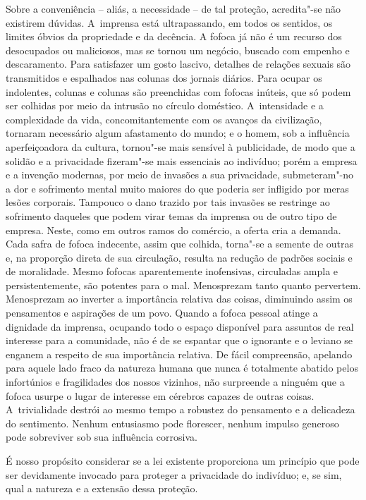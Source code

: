 Sobre a conveniência -- aliás, a necessidade -- de tal proteção,
acredita"-se não existirem dúvidas. A~imprensa está ultrapassando, em
todos os sentidos, os limites óbvios da propriedade e da decência. A
fofoca já não é um recurso dos desocupados ou maliciosos, mas se tornou
um negócio, buscado com empenho e descaramento. Para satisfazer um gosto
lascivo, detalhes de relações sexuais são transmitidos e espalhados nas
colunas dos jornais diários. Para ocupar os indolentes, colunas e
colunas são preenchidas com fofocas inúteis, que só podem ser colhidas
por meio da intrusão no círculo doméstico. A~intensidade e a
complexidade da vida, concomitantemente com os avanços da civilização,
tornaram necessário algum afastamento do mundo; e o homem, sob a
influência aperfeiçoadora da cultura, tornou"-se mais sensível à
publicidade, de modo que a solidão e a privacidade fizeram"-se mais
essenciais ao indivíduo; porém a empresa e a invenção modernas, por meio
de invasões a sua privacidade, submeteram"-no a dor e sofrimento mental
muito maiores do que poderia ser infligido por meras lesões corporais.
Tampouco o dano trazido por tais invasões se restringe ao sofrimento
daqueles que podem virar temas da imprensa ou de outro tipo de empresa.
Neste, como em outros ramos do comércio, a oferta cria a demanda. Cada
safra de fofoca indecente, assim que colhida, torna"-se a semente de
outras e, na proporção direta de sua circulação, resulta na redução de
padrões sociais e de moralidade. Mesmo fofocas aparentemente
inofensivas, circuladas ampla e persistentemente, são potentes para o
mal. Menosprezam tanto quanto pervertem. Menosprezam ao inverter a
importância relativa das coisas, diminuindo assim os pensamentos e
aspirações de um povo. Quando a fofoca pessoal atinge a dignidade da
imprensa, ocupando todo o espaço disponível para assuntos de real
interesse para a comunidade, não é de se espantar que o ignorante e o
leviano se enganem a respeito de sua importância relativa. De fácil
compreensão, apelando para aquele lado fraco da natureza humana que
nunca é totalmente abatido pelos infortúnios e fragilidades dos nossos
vizinhos, não surpreende a ninguém que a fofoca usurpe o lugar de
interesse em cérebros capazes de outras coisas. A~trivialidade destrói
ao mesmo tempo a robustez do pensamento e a delicadeza do sentimento.
Nenhum entusiasmo pode florescer, nenhum impulso generoso pode
sobreviver sob sua influência corrosiva.

É nosso propósito considerar se a lei existente proporciona um princípio
que pode ser devidamente invocado para proteger a privacidade do
indivíduo; e, se sim, qual a natureza e a extensão dessa proteção.


